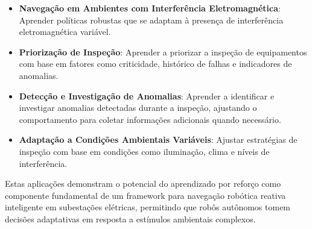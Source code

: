 \begin{itemize}
    \item \textbf{Navegação em Ambientes com Interferência Eletromagnética}: Aprender políticas robustas que se adaptam à presença de interferência eletromagnética variável.
    
    \item \textbf{Priorização de Inspeção}: Aprender a priorizar a inspeção de equipamentos com base em fatores como criticidade, histórico de falhas e indicadores de anomalias.
    
    \item \textbf{Detecção e Investigação de Anomalias}: Aprender a identificar e investigar anomalias detectadas durante a inspeção, ajustando o comportamento para coletar informações adicionais quando necessário.
    
    \item \textbf{Adaptação a Condições Ambientais Variáveis}: Ajustar estratégias de inspeção com base em condições como iluminação, clima e níveis de interferência.
\end{itemize}

Estas aplicações demonstram o potencial do aprendizado por reforço como componente fundamental de um framework para navegação robótica reativa inteligente em subestações elétricas, permitindo que robôs autônomos tomem decisões adaptativas em resposta a estímulos ambientais complexos.
